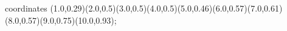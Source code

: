 					coordinates { (1.0,0.29)(2.0,0.5)(3.0,0.5)(4.0,0.5)(5.0,0.46)(6.0,0.57)(7.0,0.61)(8.0,0.57)(9.0,0.75)(10.0,0.93)};